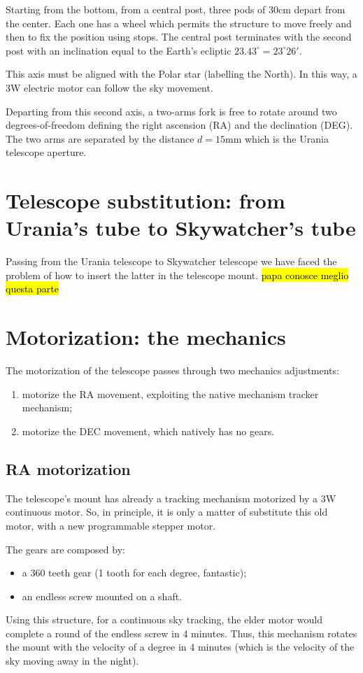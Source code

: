 \documentclass{article}
\begin{document}
\begin{multicols}{2}
        Starting from the bottom, from a central post, three pods of 30cm depart from the center. Each one has a wheel which permits the structure to move freely and then to fix the position using stops.
        The central post terminates with the second post with an inclination equal to the Earth's ecliptic \(23.43^{\circ} = 23^{\circ} 26'\).

        This axis must be aligned with the Polar star (labelling the North).
        In this way, a 3W electric motor can follow the sky movement.

        Departing from this second axis, a two-arms fork is free to rotate around two degrees-of-freedom defining the right ascension (RA) and the declination (DEG).
        The two arms are separated by the distance \(d = 15\)mm which is the Urania telescope aperture.

        \section{Telescope substitution: from Urania's tube to Skywatcher's tube}
        Passing from the Urania telescope to Skywatcher telescope we have faced the problem of how to insert the latter in the telescope mount.
        \hl{papa conosce meglio questa parte}


        \section{Motorization: the mechanics}
        The motorization of the telescope passes through two mechanics adjustments:
        \begin{enumerate}
            \item motorize the RA movement, exploiting the native mechanism tracker mechanism;
            \item motorize the DEC movement, which natively has no gears.
        \end{enumerate}

        \subsection{RA motorization}
        The telescope's mount has already a tracking mechanism motorized by a 3W continuous motor.
        So, in principle, it is only a matter of substitute this old motor, with a new programmable stepper motor.

        The gears are composed by:
        \begin{itemize}
            \item a 360 teeth gear (1 tooth for each degree, fantastic);
            \item an endless screw mounted on a shaft.
        \end{itemize}
        Using this structure, for a continuous sky tracking, the elder motor would complete a round of the endless screw in 4 minutes.
        Thus, this mechanism rotates the mount with the velocity of a degree in 4 minutes (which is the velocity of the sky moving away in the night).


\end{multicols}
\end{document}
